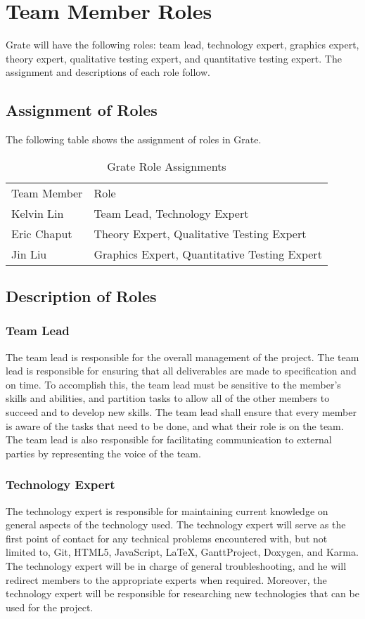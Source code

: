 \documentclass{article}
\begin{document}
\section{Team Member Roles}
Grate will have the following roles: team lead, technology expert, graphics 
expert, theory expert, qualitative testing expert, and quantitative testing 
expert. The assignment and descriptions of each role follow.

\subsection{Assignment of Roles}
The following table shows the assignment of roles in Grate.

\begin{table}[h!]
	\begin{tabular}{ll}
		Team Member & Role                                        \\
		Kelvin Lin  & Team Lead, Technology Expert                \\
		Eric Chaput & Theory Expert, Qualitative Testing Expert  \\
		Jin Liu     & Graphics Expert, Quantitative Testing Expert
	\end{tabular}

	\caption{Grate Role Assignments}
\end{table}

\subsection{Description of Roles}

\subsubsection{Team Lead}
The team lead is responsible for the overall management of the project. The team 
lead is responsible for ensuring that all deliverables are made to 
specification and on time. To accomplish this, the team lead must be sensitive 
to the member's skills and abilities, and partition tasks to allow all of the 
other members to succeed and to develop new skills. The team lead shall ensure 
that every member is aware of the tasks that need to be done, and what their 
role is on the team. The team lead is also responsible for facilitating 
communication to external parties by representing the voice of the team.

\subsubsection{Technology Expert}
The technology expert is responsible for maintaining current knowledge on 
general aspects of the technology used. The technology expert will serve as the 
first point of contact for any technical problems encountered with, but not 
limited to, Git, HTML5, JavaScript, \LaTeX, GanttProject, Doxygen, and Karma. 
The technology expert will be in charge of general troubleshooting, and he will 
redirect members to the appropriate experts when required. Moreover, the 
technology expert will be responsible for researching new technologies that can 
be used for the project.
\end{document}
